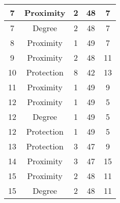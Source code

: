 \documentclass[results.tex]{subfiles}
\begin{document}
\begin{center}
\begin{tabular}{| c || c | c | c | c |}
            \hline
            7                       & Proximity                    & 2                      & 48                      & 7                    \\
            \hline
            7                       & Degree                       & 2                      & 48                      & 7                    \\
            \hline
            8                       & Proximity                    & 1                      & 49                      & 7                    \\
            \hline
            9                       & Proximity                    & 2                      & 48                      & 11                   \\
            \hline
            10                      & Protection                   & 8                      & 42                      & 13                   \\
            \hline
            11                      & Proximity                    & 1                      & 49                      & 9                    \\
            \hline
            12                      & Proximity                    & 1                      & 49                      & 5                    \\
            \hline
            12                      & Degree                       & 1                      & 49                      & 5                    \\
            \hline
            12                      & Protection                   & 1                      & 49                      & 5                    \\
            \hline
            13                      & Protection                   & 3                      & 47                      & 9                    \\
            \hline
            14                      & Proximity                    & 3                      & 47                      & 15                   \\
            \hline
            15                      & Proximity                    & 2                      & 48                      & 11                   \\
            \hline
            15                      & Degree                       & 2                      & 48                      & 11                   \\

\end{tabular}
\end{center}
\end{document}
